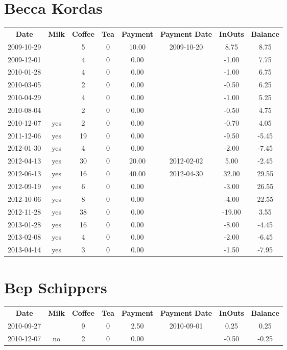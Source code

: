 \section{Becca Kordas}

\begin{center}
\begin{tabular}{cccccccc}
\textbf{Date} & \textbf{Milk} & \textbf{Coffee} & \textbf{Tea} & \textbf{Payment} & \textbf{Payment Date} & \textbf{InOuts} & \textbf{Balance} \\
2009-10-29 &  &  5 & 0 & 10.00 & 2009-10-20 &   8.75 &  8.75\\ 
2009-12-01 &  &  4 & 0 &  0.00 &  &  -1.00 &  7.75\\ 
2010-01-28 &  &  4 & 0 &  0.00 &  &  -1.00 &  6.75\\ 
2010-03-05 &  &  2 & 0 &  0.00 &  &  -0.50 &  6.25\\ 
2010-04-29 &  &  4 & 0 &  0.00 &  &  -1.00 &  5.25\\ 
2010-08-04 &  &  2 & 0 &  0.00 &  &  -0.50 &  4.75\\ 
2010-12-07 & yes &  2 & 0 &  0.00 &  &  -0.70 &  4.05\\ 
2011-12-06 & yes & 19 & 0 &  0.00 &  &  -9.50 & -5.45\\ 
2012-01-30 & yes &  4 & 0 &  0.00 &  &  -2.00 & -7.45\\ 
2012-04-13 & yes & 30 & 0 & 20.00 & 2012-02-02 &   5.00 & -2.45\\ 
2012-06-13 & yes & 16 & 0 & 40.00 & 2012-04-30 &  32.00 & 29.55\\ 
2012-09-19 & yes &  6 & 0 &  0.00 &  &  -3.00 & 26.55\\ 
2012-10-06 & yes &  8 & 0 &  0.00 &  &  -4.00 & 22.55\\ 
2012-11-28 & yes & 38 & 0 &  0.00 &  & -19.00 &  3.55\\ 
2013-01-28 & yes & 16 & 0 &  0.00 &  &  -8.00 & -4.45\\ 
2013-02-08 & yes &  4 & 0 &  0.00 &  &  -2.00 & -6.45\\ 
2013-04-14 & yes &  3 & 0 &  0.00 &  &  -1.50 & -7.95
\end{tabular}
\end{center}

\section{Bep Schippers}

\begin{center}
\begin{tabular}{cccccccc}
\textbf{Date} & \textbf{Milk} & \textbf{Coffee} & \textbf{Tea} & \textbf{Payment} & \textbf{Payment Date} & \textbf{InOuts} & \textbf{Balance} \\
2010-09-27 &  & 9 & 0 & 2.50 & 2010-09-01 &  0.25 &  0.25\\ 
2010-12-07 & no & 2 & 0 & 0.00 &  & -0.50 & -0.25
\end{tabular}
\end{center}

